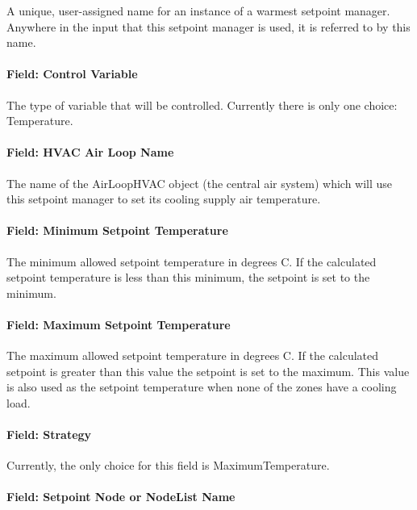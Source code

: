 A unique, user-assigned name for an instance of a warmest setpoint manager. Anywhere in the input that this setpoint manager is used, it is referred to by this name.

\paragraph{Field: Control Variable}\label{field-control-variable-10}

The type of variable that will be controlled. Currently there is only one choice: Temperature.

\paragraph{Field: HVAC Air Loop Name}\label{field-hvac-air-loop-name}

The name of the AirLoopHVAC object (the central air system) which will use this setpoint manager to set its cooling supply air temperature.

\paragraph{Field: Minimum Setpoint Temperature}\label{field-minimum-setpoint-temperature-1}

The minimum allowed setpoint temperature in degrees C. If the calculated setpoint temperature is less than this minimum, the setpoint is set to the minimum.

\paragraph{Field: Maximum Setpoint Temperature}\label{field-maximum-setpoint-temperature-1}

The maximum allowed setpoint temperature in degrees C. If the calculated setpoint is greater than this value the setpoint is set to the maximum. This value is also used as the setpoint temperature when none of the zones have a cooling load.

\paragraph{Field: Strategy}\label{field-strategy}

Currently, the only choice for this field is MaximumTemperature.

\paragraph{Field: Setpoint Node or NodeList Name}\label{field-setpoint-node-or-nodelist-name-10}

